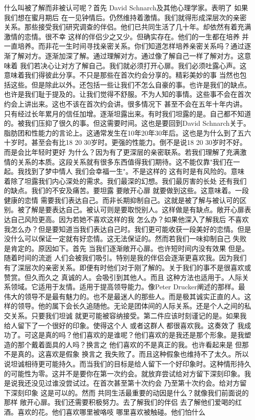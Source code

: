 什么叫被了解而非被认可呢？首先 David Schnarch及其他心理学家。表明了 如果我们想在蜜月期后 在一见钟情后。仍然维持着激情。我们就得形成深层次的亲密关系。那些接受我们研究调查的伴侣。他们已共同生活了几十年。却依然有着充满激情的恋情。很不幸 这样的伴侣少之又少。但确实存在。他们的一生都在培养 并一直培养。而非花一生时间寻找亲密关系。你们知道怎样培养亲密关系吗？通过逐渐了解对方。逐渐加深了解。通过理解对方。通过像了解自己一样了解对方。这意味着 我们若决心让对方了解自己。我们就必须打开心扉。我们必须吐露心声。这意味着我们得彼此分享。不只是那些在首次约会分享的。精彩美妙的事 当然也包括这些。但是除此以外。还包括一些让我们不怎么自豪的事。也许是我们的缺点。也许是我们耻于提及的。让我们觉得不舒服。不为人知的事情。这些事不会在首次约会上讲出来。这也不该在首次约会讲。很多情况下 甚至不会在五年十年内讲。只有经过长年累月的信任加增。逐渐坦露出来。有时我们坦露的是。自己都不知道的。被我们压抑了很久的事。但这需要时间。这也是要回到David Schnarch关于。脂肪团和性能力的言论上。这通常发生在10年20年30年后。这也是为什么到了五六十岁时。甚至会有比18 20 30岁时。更强的性能力。倒不是说18 20 30岁时不好。而是会比年轻时更好 为什么？因为有了更深层的亲密联系。若我们理解了充满激情的关系的本质。这段关系就有很多东西值得我们期待。这不能仅靠"我们在一起。我找到了梦中情人 我们会幸福一生"。不是这样的 这有时是有风险的。意味着除了坦露我们内心深处的需求。我们最深的幻想。我们最厉害的长处 还有我们的缺点。我们的不安及痛苦。要坦露 要敞开心扉 就要做到这些。这意味着。一段健康的恋情 需要我们表达自己。而非长期抑制自己。这就是被了解与被认可的区别。被了解是要表达自己。被认可则是要取悦别人。这样做是有缺点。敞开心扉表达自己风险更高。因为若她不喜欢这样的我 怎么办？如果他深入了解我后 不喜欢我怎么办？但是要知道当我们表达自己时。我们更可能收获一段美好的恋情。但是没什么可以保证一定就有好恋情。这无法保证的。然而若我们一味抑制自己 失败是肯定的。原因如下。首先 当我们逐渐敞开心扉。也许短时间内没有效果 但是。随着时间的流逝 人们会被我们吸引。特别是我的伴侣会逐渐更喜欢我。因为我们有了深层次的亲密关系。即便有时他们对于刚了解的。关于我们的事不是很喜欢或赞赏。但久而久之 真诚的人。会吸引到其他人。而且 这种方法也适用于。人际关系领域。它适用于友情。适用于提高领导能力。像Peter Drucker阐述的那样。最伟大的领导不是最有魅力的。也不是最迷人的那些人。而是极其诚实正直的人。这样的领导。他的属下会长久追随他。无论是团体间的人际关系。还是个人之间的私交关系。只要我们坦诚 就更可能被容纳接受。第二件应该时刻谨记的是。如果我给人留下了一个很好的印象。使得这个人 或者这群人 都很喜欢我。这奏效了 我成功了。可这是真的吗？他们喜欢的是谁呢？他们喜欢的是我还是那个形象。是我塑造的那个戴着面具的人吗？换言之 他们喜欢的不是真正的我。也许看起来是 但那不是真的。这喜欢是假象 换言之 我失败了。而且这种假象也维持不了太久。所以说坦诚相待更可能持久。而当我们的目标是给人留下一个好印象时。这种情形持久的可能性为零。这并不是要你在第一次约会。就放弃尝试给对方留下深刻印象。我是说我还没见过谁没尝试过。在首次甚至第十次约会 乃至第十次约会。给对方留下深刻印象 这是可以的。然而 共同生活最重要的动因是什么？就像我们前面说的那样 敞开心扉。我们还需要积极努力。去了解我们的伴侣 去了解他们爱喝的红酒。喜欢的花。他们喜欢哪里被咯吱 哪里喜欢被触碰。他们怕什么 
